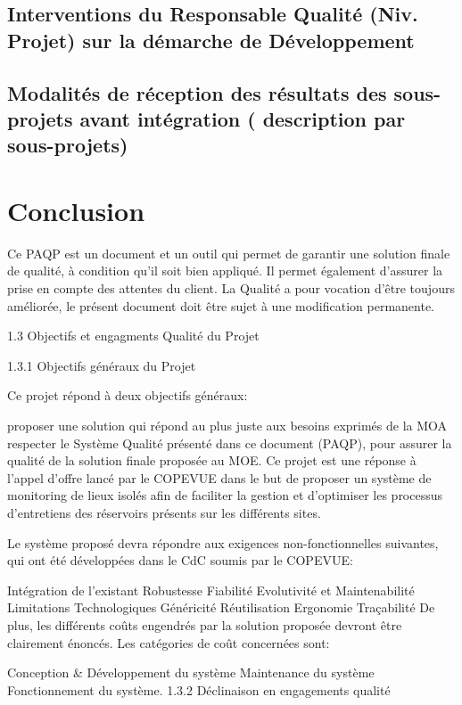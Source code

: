 \subsection{Interventions du Responsable Qualité (Niv. Projet) sur la démarche de Développement}
\subsection{Modalités de réception des résultats des sous-projets avant intégration	( description par sous-projets)}

\section{Conclusion}
Ce PAQP est un document et un outil qui permet de garantir une solution finale de qualité, à condition qu'il soit bien appliqué.
Il permet également d'assurer la prise en compte des attentes du client.
La Qualité a pour vocation d'être toujours améliorée, le présent document doit être sujet à une modification permanente.





1.3   Objectifs et engagments Qualité du Projet

1.3.1   Objectifs généraux du Projet

Ce projet répond à deux objectifs généraux:

proposer une solution qui répond au plus juste aux besoins exprimés de la MOA
respecter le Système Qualité présenté dans ce document (PAQP), pour assurer la qualité de la solution finale proposée au MOE.
Ce projet est une réponse à l'appel d'offre lancé par le COPEVUE dans le but de proposer un système de monitoring de lieux isolés afin de faciliter la gestion et d'optimiser les processus d'entretiens des réservoirs présents sur les différents sites.

Le système proposé devra répondre aux exigences non-fonctionnelles suivantes, qui ont été développées dans le CdC soumis par le COPEVUE:

Intégration de l'existant
Robustesse
Fiabilité
Evolutivité et Maintenabilité
Limitations Technologiques
Généricité
Réutilisation
Ergonomie
Traçabilité
De plus, les différents coûts engendrés par la solution proposée devront être clairement énoncés. Les catégories de coût concernées sont:

Conception \& Développement du système
Maintenance du système
Fonctionnement du système.
1.3.2   Déclinaison en engagements qualité

